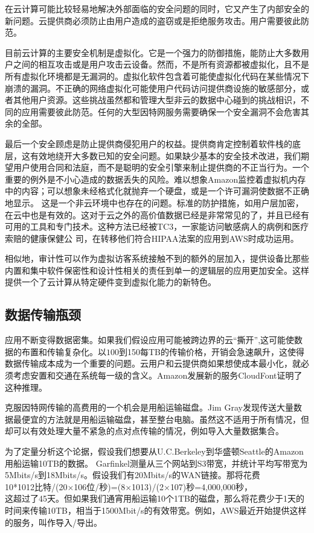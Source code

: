 在云计算可能比较轻易地解决外部面临的安全问题的同时，它又产生了内部安全的新问题。云提供商必须防止由用户造成的盗窃或是拒绝服务攻击。用户需要彼此防范。

目前云计算的主要安全机制是虚拟化。它是一个强力的防御措施，能防止大多数用户之间的相互攻击或是用户攻击云设备。然而，不是所有资源都被虚拟化，且不是所有虚拟化环境都是无漏洞的。虚拟化软件包含着可能使虚拟化代码在某些情况下崩溃的漏洞。不正确的网络虚拟化可能使用户代码访问提供商设施的敏感部分，或者其他用户资源。这些挑战虽然都和管理大型非云的数据中心碰到的挑战相识，不同的应用需要彼此防范。任何的大型因特网服务需要确保一个安全漏洞不会危害其余的全部。

最后一个安全顾虑是防止提供商侵犯用户的权益。提供商肯定控制着软件栈的底层，这有效地绕开大多数已知的安全问题。如果缺少基本的安全技术改进，我们期望用户使用合同和法庭，而不是聪明的安全引擎来制止提供商的不正当行为。一个重要的例外是不小心造成的数据丢失的风险。难以想象Amazon监控着虚拟机内存中的内容；可以想象未经格式化就抛弃一个硬盘，或是一个许可漏洞使数据不正确地显示。
这是一个非云环境中也存在的问题。标准的防护措施，如用户层加密，在云中也是有效的。这对于云之外的高价值数据已经是非常常见的了，并且已经有可用的工具和专门技术。这种方法已经被TC3，一家能访问敏感病人的病例和医疗索赔的健康保健公
司，在转移他们符合HIPAA法案的应用到AWS时成功运用。

相似地，审计性可以作为虚拟访客系统接触不到的额外的层加入，提供设备比那些内置和集中软件保密性和设计性相关的责任到单一的逻辑层的应用更加安全。这样提供一个了云计算从特定硬件变到虚拟化能力的新特色。

\subsection{数据传输瓶颈}

应用不断变得数据密集。如果我们假设应用可能被跨边界的云“撕开”,这可能使数据的布置和传输复杂化。以$100到$150每TB的传输价格，开销会急速飙升，这使得数据传输成本成为一个重要的问题。云用户和云提供商如果想使成本最小化，就必须考虑安置和交通在系统每一级的含义。Amazon发展新的服务CloudFont证明了这种推理。

克服因特网传输的高费用的一个机会是用船运输磁盘。Jim Gray发现传送大量数据最便宜的方法就是用船运输磁盘，甚至整台电脑。虽然这不适用于所有情况，但却可以有效处理大量不紧急的点对点传输的情况，例如导入大量数据集合。

为了定量分析这个论据，假设我们想要从U.C.Berkeley到华盛顿Seattle的Amazon用船运输10TB的数据。 Garfinkel测量从三个网站到S3带宽，并统计平均写带宽为5Mbits/s到18Mbits/s。假设我们有20Mbits/s的WAN链接。那将花费\\
10*1012比特/(20$\times$106位/秒)=(8$\times$1013)/(2$\times$107)秒=4,000,000秒，\\
这超过了45天。但如果我们通宵用船运输10个1TB的磁盘，那么将花费少于1天的时间来传输10TB，相当于1500Mbit/s的有效带宽。例如，AWS最近开始提供这样的服务，叫作导入/导出。

